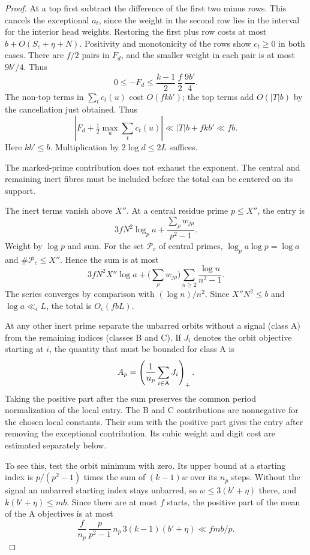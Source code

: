 \begin{proof}
At a top first subtract the
difference of the first two minus rows. This cancels the exceptional
\(a_t\), since the weight in the second row lies in the interval
for the interior head weights. Restoring the first
plus row costs at most \(b+O(S_c+\eta+N)\). Positivity and
monotonicity of the rows show \(c_t\ge0\) in both cases. There are \(f/2\) pairs in \(F_d\), and the smaller weight in each
pair is at most \(9b'/4\). Thus
\[
 0\le -F_d\le \frac{k-1}{2}\,\frac f2\,\frac{9b'}4 .
\]
The non-top terms in \(\sum_t c_t(u)\) cost \(O(fkb')\);
the top terms add \(O(|T|b)\) by the cancellation just obtained. Thus
\[
 |F_d+\tfrac12\max_u\sum_t c_t(u)|
          \ll |T|b+fkb'\ll fb .
\]
Here \(kb'\le b\). Multiplication by \(2\log d\le2L\) suffices.


The marked-prime contribution does not exhaust the exponent. The central and remaining inert fibres must be included before the total can be centered on its support.


The inert terms vanish above \(X''\). At a central residue prime \(p\le X''\), the entry is
\[
 3fN^2\log_p a+\frac{\sum_\rho w_{j\rho}}{p^2-1}.
\]
Weight by \(\log p\) and sum. For the set \(\mathcal P_c\) of central primes, \(\log_p a\log p=\log a\)
and \(\#\mathcal P_c\le X''\). Hence the sum is at most
\[
 3fN^2 X''\log a+
  \Big(\sum_\rho w_{j\rho}\Big)\sum_{n\ge2}\frac{\log n}{n^2-1}.
\]
The series converges by comparison with \((\log n)/n^2\). Since \(X''N^2\le b\) and
\(\log a\ll_\epsilon L\), the total is \(O_\epsilon(fbL)\).

At any other inert prime separate the unbarred orbits without a
signal (class A) from the remaining indices (classes B and C).
If \(J_i\) denotes the orbit objective starting at \(i\), the
quantity that must be bounded for class A is
\[
 A_p=\left(\frac1{n_p}\sum_{i\in {\rm A}}J_i\right)_+ .
\]
Taking the positive part after the sum preserves the common period
normalization of the local entry. The B and C contributions are nonnegative
for the chosen local constants. Their sum with the positive part gives the entry after removing
the exceptional contribution. Its cubic weight and digit cost
are estimated separately below.

To see this, test the
orbit minimum with zero. Its upper bound at a starting index is
\(p/(p^2-1)\) times the sum of \((k-1)w\) over its \(n_p\)
steps. Without the signal an unbarred starting index stays
unbarred, so \(w\le 3(b'+\eta)\) there, and
\(k(b'+\eta)\le mb\). Since there are at most \(f\) starts, the positive part of
the mean of the A objectives is at most
\[
 \frac{f}{n_p}\,\frac{p}{p^2-1}\,n_p\,3(k-1)(b'+\eta)
       \ll fmb/p .
\]


\end{proof}
